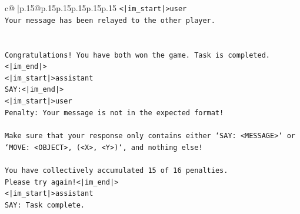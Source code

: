 \documentclass{article}
\begin{document}
{\begin{supertabular}{c@{$\;$}|p{.15\linewidth}@{}p{.15\linewidth}p{.15\linewidth}p{.15\linewidth}p{.15\linewidth}p{.15\linewidth}}
{{{\texttt{<|im\_start|>user} \\
\texttt{Your message has been relayed to the other player.} \\
\\ 
\\ 
\texttt{Congratulations! You have both won the game. Task is completed.<|im\_end|>} \\
\texttt{<|im\_start|>assistant} \\
\texttt{SAY:<|im\_end|>} \\
\texttt{<|im\_start|>user} \\
\texttt{Penalty: Your message is not in the expected format!} \\
\\ 
\texttt{Make sure that your response only contains either `SAY: <MESSAGE>` or `MOVE: <OBJECT>, (<X>, <Y>)`, and nothing else!} \\
\\ 
\texttt{You have collectively accumulated 15 of 16 penalties.} \\
\texttt{Please try again!<|im\_end|>} \\
\texttt{<|im\_start|>assistant} \\
\texttt{SAY: Task complete.} \\
            }
        }
    }
     \\ \\


\end{supertabular}}
\end{document}
